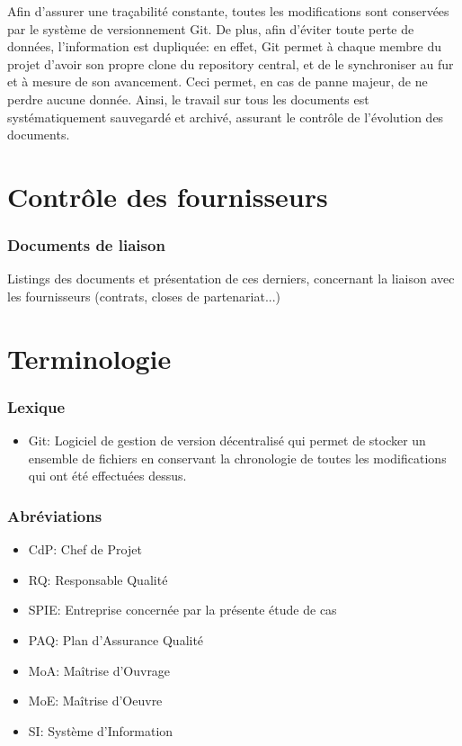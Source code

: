 \documentclass[a4paper, 18pt]{article}
\begin{document}
Afin d'assurer une traçabilité constante, toutes les modifications sont conservées par le système de versionnement Git. De plus, afin d'éviter toute perte de données, l'information est dupliquée: en effet, Git permet à chaque membre du projet d'avoir son propre clone du repository central, et de le synchroniser au fur et à mesure de son avancement. Ceci permet, en cas de panne majeur, de ne perdre aucune donnée. Ainsi, le travail sur tous les documents est systématiquement sauvegardé et archivé, assurant le contrôle de l'évolution des documents.

\part{Contrôle des fournisseurs}

\section{Documents de liaison}

Listings des documents et présentation de ces derniers, concernant la liaison avec les fournisseurs (contrats, closes de partenariat...)

\part{Terminologie}

\section{Lexique}

\begin{itemize}
\item Git: Logiciel de gestion de version décentralisé qui permet de stocker un ensemble de fichiers en conservant la chronologie de toutes les modifications qui ont été effectuées dessus.
\end{itemize}

\section{Abréviations}

\begin{itemize}
\item CdP: Chef de Projet
\item RQ: Responsable Qualité
\item SPIE: Entreprise concernée par la présente étude de cas
\item PAQ: Plan d'Assurance Qualité
\item MoA: Maîtrise d'Ouvrage
\item MoE: Maîtrise d'Oeuvre
\item SI: Système d'Information
\end{itemize}
\end{document}
